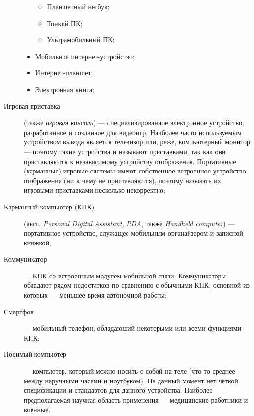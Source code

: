 \begin{description}
\begin{itemize}
         \begin{itemize}
          \item Планшетный нетбук;
          \item Тонкий ПК;
          \item Ультрамобильный ПК;
         \end{itemize}
   \item Мобильное интернет-устройство;
   \item Интернет-планшет;
   \item Электронная книга;
  \end{itemize}
 \item[Игровая приставка] (также \emph{игровая консоль}) --- специализированное электронное устройство, разработанное и созданное для видеоигр. Наиболее часто используемым устройством вывода является телевизор или, реже, компьютерный монитор --- поэтому такие устройства и называют приставками, так как они приставляются к независимому устройству отображения.
 Портативные (карманные) игровые системы имеют собственное встроенное устройство отображения (ни к чему не приставляются), поэтому называть их игровыми приставками несколько некорректно;
 \item[Карманный компьютер (КПК)] (англ. \emph{Personal Digital Assistant, PDA}, также \emph{Handheld computer}) --- портативное устройство, служащее мобильным органайзером и записной книжкой;
 \item[Коммуникатор] --- КПК со встроенным модулем мобильной связи. Коммуникаторы обладают рядом недостатков по сравнению с обычными КПК, основной из которых --- меньшее время автономной работы;
 \item[Смартфон] --- мобильный телефон, обладающий некоторыми или всеми функциями КПК;
 \item[Носимый компьютер] --- компьютер, который можно носить с собой на теле (что-то среднее между наручными часами и ноутбуком). На данный момент нет чёткой спецификации и стандартов для данного устройства. Наиболее предполагаемая научная область применения --- медицинские работники и военные.
\end{description}
